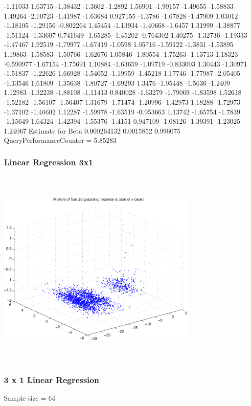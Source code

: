 \documentclass[9pt]{article}
\theoremstyle{plain}
\theoremstyle{definition}
\theoremstyle{remark}
\numberwithin{equation}{section}
\begin{document}
-1.11033
1.63715
-1.38432
-1.3602
-1.2892
1.56901
-1.99157
-1.49655
-1.58833
1.49264
-2.10723
-1.41987
-1.63684
0.927155
-1.3786
-1.67828
-1.47909
1.03012
-1.18105
-1.29156
-0.802264
1.45454
-1.13934
-1.40668
-1.6457
1.31999
-1.38877
-1.51124
-1.33607
0.741649
-1.65285
-1.45202
-0.764302
1.40275
-1.32736
-1.19333
-1.47467
1.92519
-1.79977
-1.67419
-1.0598
1.05716
-1.59122
-1.3831
-1.53895
1.19863
-1.58583
-1.50766
-1.62676
1.05846
-1.80554
-1.75263
-1.13713
1.18323
-0.590977
-1.67154
-1.75691
1.10884
-1.63659
-1.09719
-0.833093
1.30443
-1.30971
-1.51837
-1.22626
1.66928
-1.54052
-1.19959
-1.45218
1.17746
-1.77987
-2.05405
-1.13546
1.61809
-1.35638
-1.80727
-1.69293
1.3476
-1.95448
-1.5636
-1.2409
1.12983
-1.32238
-1.88108
-1.11413
0.840028
-1.63279
-1.79069
-1.83598
1.52618
-1.52182
-1.56107
-1.56407
1.31679
-1.71474
-1.20996
-1.42973
1.18288
-1.72973
-1.37102
-1.46602
1.12287
-1.59978
-1.63519
-0.953663
1.13742
-1.65754
-1.7839
-1.15649
1.64324
-1.42394
-1.55376
-1.4151
0.947109
-1.08126
-1.39391
-1.23025
1.24067
Estimate for Beta
0.000264132
0.0015852
0.996075
QueryPerformanceCounter  =  5.85283
\subsubsection{Linear Regression 3x1}
\includegraphics[width=10.0cm,height=10.0cm]{AtanDataSet.pdf}

\subsubsection{3 x 1 Linear Regression}
Sample size = 64
\end{document}
